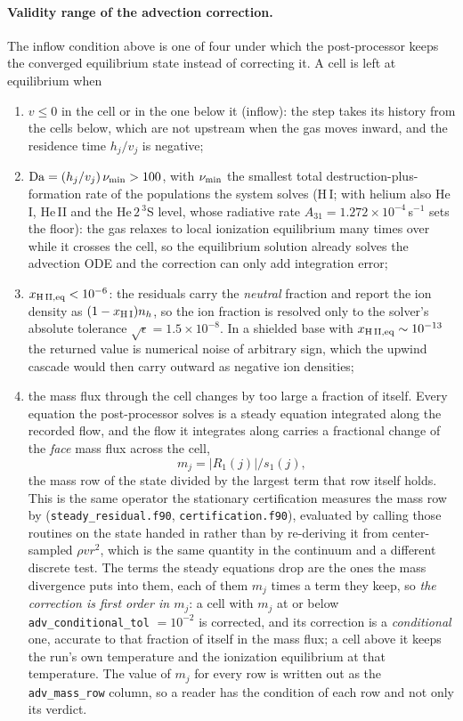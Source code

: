 \documentclass[english,a4paper]{my_memo}
\begin{document}
\paragraph{Validity range of the advection correction.}\label{sec:advvalidity}
The inflow condition above is one
of four under which the post-processor keeps the converged equilibrium state instead
of correcting it. A cell is left at equilibrium when
\begin{enumerate}\itemsep2pt
\item $v\le0$ in the cell or in the one below it (inflow): the step takes its history from
  the cells below, which are not upstream when the gas moves inward, and the residence time
  $h_j/v_j$ is negative;
\item ${\rm Da} = (h_j/v_j)\,\nu_{\rm min} > 100$, with $\nu_{\rm min}$ the smallest total
  destruction-plus-formation rate of the populations the system solves (H\,I; with helium
  also He\,I, He\,II and the He\,$2\,^3$S level, whose radiative rate
  $A_{31}=1.272\times10^{-4}$\,s$^{-1}$ sets the floor): the gas relaxes to local ionization
  equilibrium many times over while it crosses the cell, so the equilibrium solution already
  solves the advection ODE and the correction can only add integration error;
\item $x_{\rm H\,II,eq} < 10^{-6}$: the residuals carry the \emph{neutral} fraction and
  report the ion density as $(1-x_{\rm H\,I})n_h$, so the ion fraction is resolved only to
  the solver's absolute tolerance $\sqrt{\epsilon} = 1.5\times10^{-8}$. In a shielded base
  with $x_{\rm H\,II,eq}\sim10^{-13}$ the returned value is numerical noise of arbitrary
  sign, which the upwind cascade would then carry outward as negative ion densities;
\item the mass flux through the cell changes by too large a fraction of itself. Every
  equation the post-processor solves is a steady equation integrated along the recorded
  flow, and the flow it integrates along carries a fractional change of the \emph{face}
  mass flux across the cell,
  \begin{equation*}
  m_j = |R_1(j)|/s_1(j),
  \end{equation*}
  the mass row of the state divided by the largest term that row itself holds. This is the
  same operator the stationary certification measures the mass row by
  (\texttt{steady\_residual.f90}, \texttt{certification.f90}), evaluated by calling those
  routines on the state handed in rather than by re-deriving it from center-sampled
  $\rho v r^2$, which is the same quantity in the continuum and a different discrete test.
  The terms the steady equations drop are the ones the mass divergence puts into them,
  each of them $m_j$ times a term they keep, so \emph{the correction is first order in
  $m_j$}: a cell with $m_j$ at or below \texttt{adv\_conditional\_tol} $=10^{-2}$ is
  corrected, and its correction is a \emph{conditional} one, accurate to that fraction of
  itself in the mass flux; a cell above it keeps the run's own temperature and the
  ionization equilibrium at that temperature. The value of $m_j$ for every row is written
  out as the \texttt{adv\_mass\_row} column, so a reader has the condition of each row and
  not only its verdict.
\end{enumerate}
\end{document}

